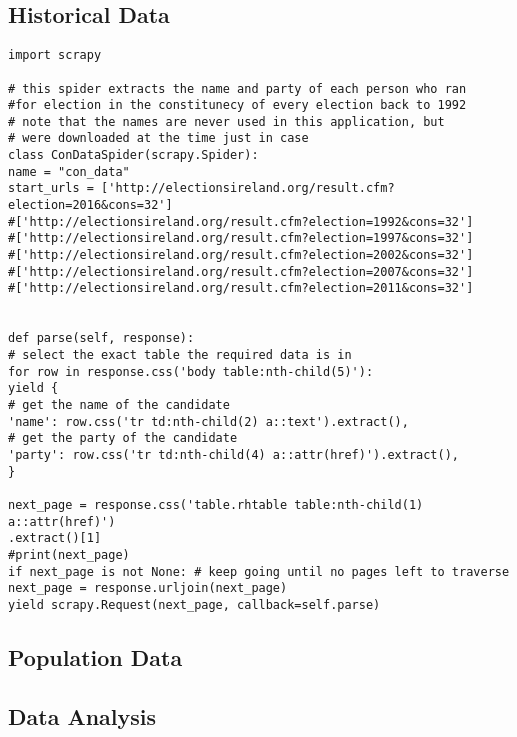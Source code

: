 \subsection{Historical Data}
\begin{verbatim}
import scrapy

# this spider extracts the name and party of each person who ran 
#for election in the constitunecy of every election back to 1992
# note that the names are never used in this application, but 
# were downloaded at the time just in case
class ConDataSpider(scrapy.Spider):
name = "con_data"
start_urls = ['http://electionsireland.org/result.cfm?election=2016&cons=32']
#['http://electionsireland.org/result.cfm?election=1992&cons=32']
#['http://electionsireland.org/result.cfm?election=1997&cons=32']
#['http://electionsireland.org/result.cfm?election=2002&cons=32']
#['http://electionsireland.org/result.cfm?election=2007&cons=32']
#['http://electionsireland.org/result.cfm?election=2011&cons=32']


def parse(self, response):
# select the exact table the required data is in
for row in response.css('body table:nth-child(5)'): 
yield {
# get the name of the candidate
'name': row.css('tr td:nth-child(2) a::text').extract(), 
# get the party of the candidate
'party': row.css('tr td:nth-child(4) a::attr(href)').extract(), 
}

next_page = response.css('table.rhtable table:nth-child(1) a::attr(href)')
.extract()[1]
#print(next_page)
if next_page is not None: # keep going until no pages left to traverse
next_page = response.urljoin(next_page)
yield scrapy.Request(next_page, callback=self.parse)
\end{verbatim}
\subsection{Population Data}
\subsection{Data Analysis}
